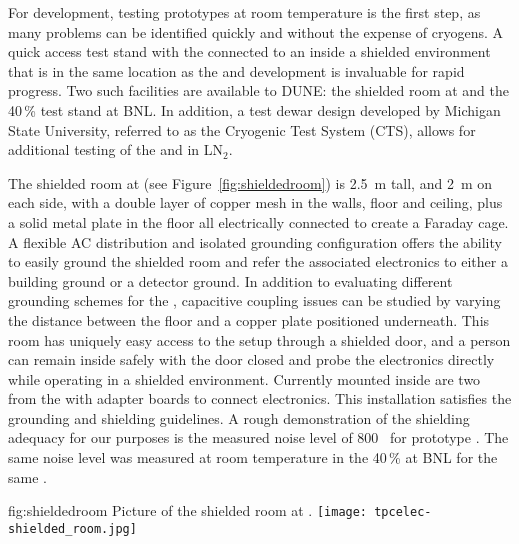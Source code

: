 For  development, testing prototypes at room temperature is the first step, as many problems can be identified quickly and without the expense of cryogens.  A quick access test stand with the  connected to an  inside a shielded environment that is in the same location as the  and  development is invaluable for rapid progress.  Two such facilities are available to DUNE: the shielded room at \fnal and the \num{40}\,\%  test stand at BNL.  In addition, a test dewar design developed by Michigan State University, referred to as the Cryogenic Test System (CTS), allows for additional testing of the  and  in LN$_2$.

The shielded room at \fnal (see Figure~\ref{fig:shieldedroom}) is \SI{2.5}{m} tall, and \SI{2}{m} on each side, with 
a double layer of copper mesh in the walls, floor and ceiling, plus a solid metal plate in the floor all electrically connected to create a Faraday cage.  A flexible AC distribution and isolated grounding configuration offers the ability to easily ground the shielded room and refer the associated electronics to either a building ground or a detector ground.  In addition
to evaluating different grounding schemes for the , capacitive coupling issues can be studied by varying the
distance between the floor and a copper plate positioned underneath.   
This room has uniquely easy access to the setup through a shielded door,
and a person can remain inside safely with the door closed and probe the electronics directly while operating
in a shielded environment.  Currently mounted inside are two  from the  
with adapter boards to connect  electronics.  This installation satisfies the  grounding and shielding guidelines.  A rough demonstration of the shielding adequacy for our purposes  is the measured noise level of 800~ for  prototype .  The same noise level was measured at room temperature in the \num{40}\,\%  at BNL for the same .

\begin{dunefigure}
{fig:shieldedroom}
{Picture of the shielded room at \fnal.}
\texttt{[image: tpcelec-shielded\_room.jpg]}
\end{dunefigure}

